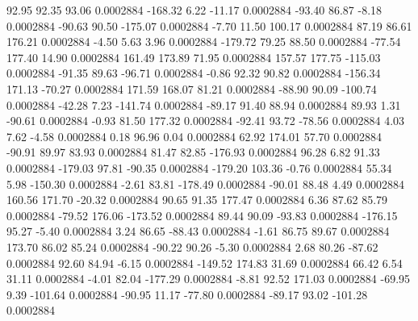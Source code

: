        92.95       92.35       93.06     0.0002884
     -168.32        6.22      -11.17     0.0002884
      -93.40       86.87       -8.18     0.0002884
      -90.63       90.50     -175.07     0.0002884
       -7.70       11.50      100.17     0.0002884
       87.19       86.61      176.21     0.0002884
       -4.50        5.63        3.96     0.0002884
     -179.72       79.25       88.50     0.0002884
      -77.54      177.40       14.90     0.0002884
      161.49      173.89       71.95     0.0002884
      157.57      177.75     -115.03     0.0002884
      -91.35       89.63      -96.71     0.0002884
       -0.86       92.32       90.82     0.0002884
     -156.34      171.13      -70.27     0.0002884
      171.59      168.07       81.21     0.0002884
      -88.90       90.09     -100.74     0.0002884
      -42.28        7.23     -141.74     0.0002884
      -89.17       91.40       88.94     0.0002884
       89.93        1.31      -90.61     0.0002884
       -0.93       81.50      177.32     0.0002884
      -92.41       93.72      -78.56     0.0002884
        4.03        7.62       -4.58     0.0002884
        0.18       96.96        0.04     0.0002884
       62.92      174.01       57.70     0.0002884
      -90.91       89.97       83.93     0.0002884
       81.47       82.85     -176.93     0.0002884
       96.28        6.82       91.33     0.0002884
     -179.03       97.81      -90.35     0.0002884
     -179.20      103.36       -0.76     0.0002884
       55.34        5.98     -150.30     0.0002884
       -2.61       83.81     -178.49     0.0002884
      -90.01       88.48        4.49     0.0002884
      160.56      171.70      -20.32     0.0002884
       90.65       91.35      177.47     0.0002884
        6.36       87.62       85.79     0.0002884
      -79.52      176.06     -173.52     0.0002884
       89.44       90.09      -93.83     0.0002884
     -176.15       95.27       -5.40     0.0002884
        3.24       86.65      -88.43     0.0002884
       -1.61       86.75       89.67     0.0002884
      173.70       86.02       85.24     0.0002884
      -90.22       90.26       -5.30     0.0002884
        2.68       80.26      -87.62     0.0002884
       92.60       84.94       -6.15     0.0002884
     -149.52      174.83       31.69     0.0002884
       66.42        6.54       31.11     0.0002884
       -4.01       82.04     -177.29     0.0002884
       -8.81       92.52      171.03     0.0002884
      -69.95        9.39     -101.64     0.0002884
      -90.95       11.17      -77.80     0.0002884
      -89.17       93.02     -101.28     0.0002884
